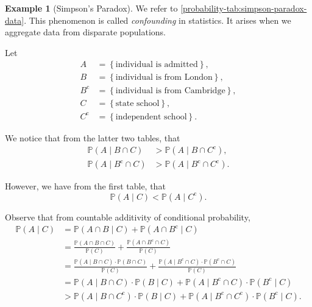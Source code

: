 \documentclass[11pt]{article}
\numberwithin{equation}{section}
\theoremstyle{definition}
\newtheorem{example}[theorem]{Example}
\theoremstyle{remark}
\newcommand{\pqty}[1]{\left(#1\right)}
\newcommand{\Bqty}[1]{\left\{#1\right\}}
\newcommand{\compl}{^{\mathrm c}}
\newcommand{\Prob}{\mathbb P}
\newcommand{\Conditional}[2]{#1\mid #2}
\begin{document}
\begin{example}[Simpson's Paradox]\label{probability-example-012}
    \label{probability-ex:simpson-paradox}%
    We refer to \autoref{probability-tab:simpson-paradox-data}. This phenomenon is called \emph{confounding} in statistics. It arises when we aggregate data from disparate populations.

    Let
    \begin{align*}
        A &= \Bqty{\text{individual is admitted}}, \\
        B &= \Bqty{\text{individual is from London}}, \\
        B\compl &= \Bqty{\text{individual is from Cambridge}}, \\
        C &= \Bqty{\text{state school}}, \\
        C\compl &= \Bqty{\text{independent school}}.
    \end{align*}

    We notice that from the latter two tables, that
    \begin{align*}
        \Prob\pqty{\Conditional{A}{B \cap C}} &> \Prob\pqty{\Conditional{A}{B \cap C \compl}}, \\
        \Prob\pqty{\Conditional{A}{B\compl \cap C}} &> \Prob\pqty{\Conditional{A}{B\compl \cap C \compl}}.
    \end{align*}

    However, we have from the first table, that
    \[
        \Prob\pqty{\Conditional{A}{C}} < \Prob\pqty{\Conditional{A}{C\compl}}.
    \]

    Observe that from countable additivity of conditional probability,
    \begin{align*}
        \Prob\pqty{\Conditional{A}{C}} &= \Prob\pqty{\Conditional{A \cap B}{C}} + \Prob\pqty{\Conditional{A \cap B\compl}{C}} \\
        &= \frac{\Prob\pqty{A \cap B \cap C}}{\Prob\pqty{C}} + \frac{\Prob\pqty{A \cap B\compl \cap C}}{\Prob\pqty{C}} \\
        &= \frac{\Prob\pqty{\Conditional{A}{B \cap C}} \cdot \Prob\pqty{B \cap C}}{\Prob\pqty{C}} + \frac{\Prob\pqty{\Conditional{A}{B \compl \cap C}} \cdot \Prob\pqty{B\compl \cap C}}{\Prob\pqty{C}} \\
        &= \Prob\pqty{\Conditional{A}{B \cap C}} \cdot \Prob\pqty{\Conditional{B}{C}} + \Prob\pqty{\Conditional{A}{B\compl \cap C}} \cdot \Prob\pqty{\Conditional{B \compl}{C}} \\
        &> \Prob\pqty{\Conditional{A}{B \cap C\compl}} \cdot \Prob\pqty{\Conditional{B}{C}} + \Prob\pqty{\Conditional{A}{B\compl \cap C\compl}} \cdot \Prob \pqty{\Conditional{B\compl}{C}}.
    \end{align*}


\end{example}
\end{document}
